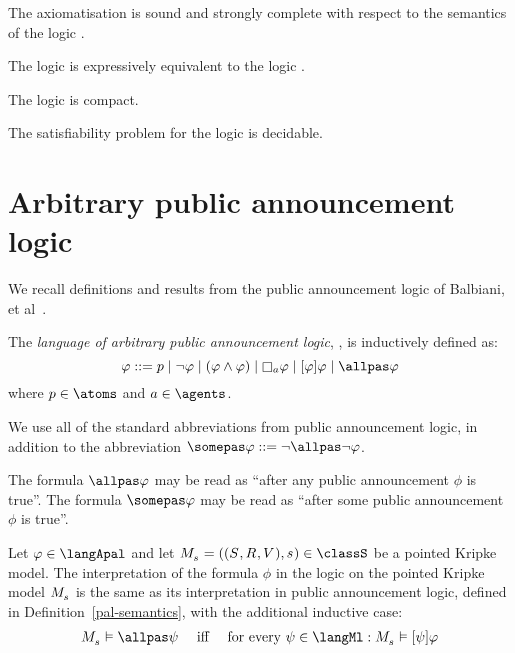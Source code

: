 \begin{proposition}
The axiomatisation \axiomPalS{} is sound and strongly complete with respect to the semantics of the logic \logicPalS{}.
\end{proposition}

\begin{proposition}
The logic \logicPalS{} is expressively equivalent to the logic \logicS{}.
\end{proposition}

\begin{proposition}
The logic \logicPalS{} is compact.
\end{proposition}

\begin{proposition}
The satisfiability problem for the logic \logicPalS{} is decidable.
\end{proposition}

\section{Arbitrary public announcement logic}\label{apal}

We recall definitions and results from the public announcement logic of Balbiani, et al~\cite{balbiani:2008}.

\begin{definition}
The {\em language of arbitrary public announcement logic}, \langApal{}, is inductively defined as:
$$
\phi ::= 
    \atomP \mid
    \lnot \phi \mid
    (\phi \land \phi) \mid
    \necessaryA \phi \mid
    \announceA{\phi} \phi \mid
    \allpas \phi
$$
where $\atomP \in \atoms$ and $\agentA \in \agents$.
\end{definition}

We use all of the standard abbreviations from public announcement logic, in addition to the abbreviation $\somepas \phi ::= \lnot \allpas \lnot \phi$.

The formula $\allpas \phi$ may be read as ``after any public announcement $\phi$ is true''.
The formula $\somepas \phi$ may be read as ``after some public announcement $\phi$ is true''.

\begin{definition}
Let $\phi \in \langApal$ and let $\kPModelAndTuple{\kStateS} \in \classS$ be a pointed Kripke model.
The interpretation of the formula $\phi$ in the logic \logicApalS{} on the pointed Kripke model $\kPModel{\kStateS}$ is the same as its interpretation in public announcement logic, defined in Definition~\ref{pal-semantics}, with the additional inductive case:
$$
\begin{array}{lcl}
    \kPModel{\kStateS} \entails \allpas \psi & \text{ iff } & \text{for every } \psi \in \langMl : \kPModel{\kStateS} \entails \announceA{\psi} \phi
\end{array}
$$
\end{definition}

